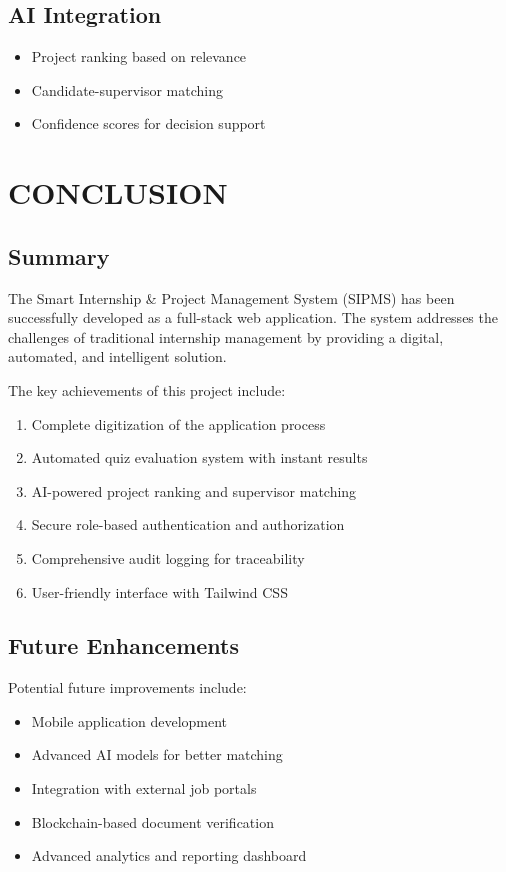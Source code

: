\documentclass[12pt,a4paper]{report}
\begin{document}
\section{AI Integration}
\begin{itemize}
    \item Project ranking based on relevance
    \item Candidate-supervisor matching
    \item Confidence scores for decision support
\end{itemize}

\chapter{CONCLUSION}

\section{Summary}
The Smart Internship \& Project Management System (SIPMS) has been successfully developed as a full-stack web application. The system addresses the challenges of traditional internship management by providing a digital, automated, and intelligent solution.

The key achievements of this project include:

\begin{enumerate}
    \item Complete digitization of the application process
    \item Automated quiz evaluation system with instant results
    \item AI-powered project ranking and supervisor matching
    \item Secure role-based authentication and authorization
    \item Comprehensive audit logging for traceability
    \item User-friendly interface with Tailwind CSS
\end{enumerate}

\section{Future Enhancements}
Potential future improvements include:

\begin{itemize}
    \item Mobile application development
    \item Advanced AI models for better matching
    \item Integration with external job portals
    \item Blockchain-based document verification
    \item Advanced analytics and reporting dashboard
\end{itemize}
\end{document}
